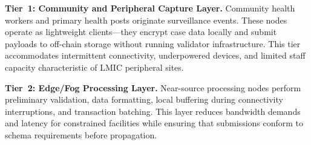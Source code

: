 \documentclass[AMA,LATO1COL]{WileyNJD-v2}
\begin{document}
%
%
%
%
%
%
%

\textbf{Tier~1: Community and Peripheral Capture Layer.} Community health workers and primary health posts originate surveillance events. These nodes operate as lightweight clients---they encrypt case data locally and submit payloads to off-chain storage without running validator infrastructure. This tier accommodates intermittent connectivity, underpowered devices, and limited staff capacity characteristic of LMIC peripheral sites.

\textbf{Tier~2: Edge/Fog Processing Layer.} Near-source processing nodes perform preliminary validation, data formatting, local buffering during connectivity interruptions, and transaction batching. This layer reduces bandwidth demands and latency for constrained facilities while ensuring that submissions conform to schema requirements before propagation.
\end{document}

